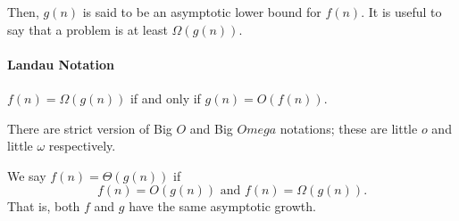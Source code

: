 Then, \(g(n)\) is said to be an asymptotic lower bound for \(f(n)\).
It is useful to say that a problem is at least \(\Omega(g(n))\).

\paragraph{Landau Notation}
\(f(n) = \Omega (g(n))\) if and only if \(g(n) = O(f(n))\).

There are strict version of Big \(O\) and Big \(Omega\) notations; these are little \(o\) and little \(\omega\) respectively.

We say \(f(n) = \Theta(g(n))\) if
\[
    f(n) = O(g(n)) \text{ and } f(n) = \Omega(g(n)).
\]
That is, both \(f\) and \(g\) have the same asymptotic growth.


